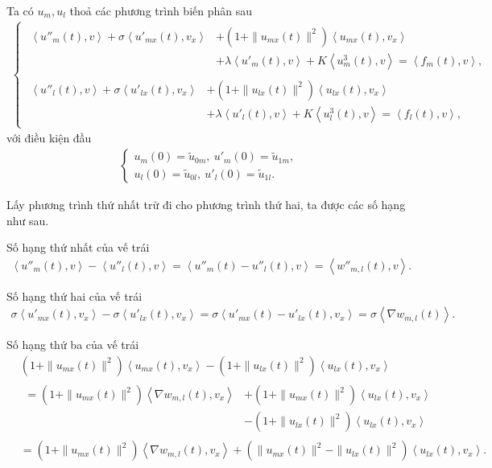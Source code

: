 \documentclass[12pt,a4paper]{article}
\theoremstyle{definition}
\begin{document}
Ta có $u_m, u_l$ thoả các phương trình biến phân sau
\begin{align*}
\begin{cases}
        \begin{aligned}
            \left<u''_m(t), v\right>
            + \sigma \left<u'_{mx}(t),v_x\right>
            &+ \left(1 + \|u_{mx}(t)\|^2\right) \left<u_{mx} (t),v_x\right> \\[0.1cm]
            &+ \lambda \left<u'_m(t),v\right>
            + K \left<u^3_m(t),v\right>
            = \left<f_m(t),v\right>,
        \end{aligned} \\[0.3cm]
        \begin{aligned}
            \left<u''_l(t), v\right>
            + \sigma \left<u'_{lx}(t),v_x\right>
            &+ \left(1 + \|u_{lx}(t)\|^2\right) \left<u_{lx}(t),v_x\right> \\[0.1cm]
            &+ \lambda \left<u'_l(t),v\right>
            + K \left<u^3_l(t),v\right>
            = \left<f_l(t),v\right>,
        \end{aligned}
\end{cases}
\end{align*}
với điều kiện đầu
\begin{align*}
\begin{cases}
    u_m(0) = \tilde{u}_{0m},\ u'_m(0) = \tilde{u}_{1m}, \\
    u_l(0) = \tilde{u}_{0l},\ u'_l(0) = \tilde{u}_{1l}.
\end{cases}
\end{align*}

Lấy phương trình thứ nhất trừ đi cho phương trình thứ hai, ta được các số hạng như sau.

Số hạng thứ nhất của vế trái
\begin{align*}
    \left<u''_m(t),v\right> - \left<u''_l(t),v\right>
    = \left<u''_m(t) - u''_l(t),v\right>
    = \left<w''_{m,l}(t),v\right>.
\end{align*}

Số hạng thứ hai của vế trái
\begin{align*}
    \sigma \left<u'_{mx}(t),v_x\right> - \sigma \left<u'_{lx}(t),v_x\right>
    = \sigma \left<u'_{mx}(t) - u'_{lx}(t),v_x\right>
    = \sigma \left<\nabla w_{m,l}(t)\right>.
\end{align*}

Số hạng thứ ba của vế trái
\begin{align*}
    &\left(1 + \|u_{mx}(t)\|^2\right) \left<u_{mx}(t),v_x\right> - \left(1 + \|u_{lx}(t)\|^2\right) \left<u_{lx}(t),v_x\right> \\
    &\begin{aligned}= \left(1 + \|u_{mx}(t)\|^2\right) \left<\nabla w_{m,l}(t),v_x\right> &+ \left(1 + \|u_{mx}(t)\|^2\right) \left<u_{lx}(t),v_x\right> \\ &- \left(1 + \|u_{lx}(t)\|^2\right) \left<u_{lx}(t),v_x\right>
    \end{aligned}\\
    &= \left(1 + \|u_{mx}(t)\|^2\right) \left<\nabla w_{m,l}(t),v_x\right> + \left(\|u_{mx}(t)\|^2 - \|u_{lx}(t)\|^2\right) \left<u_{lx}(t),v_x\right>.
\end{align*}
\end{document}

